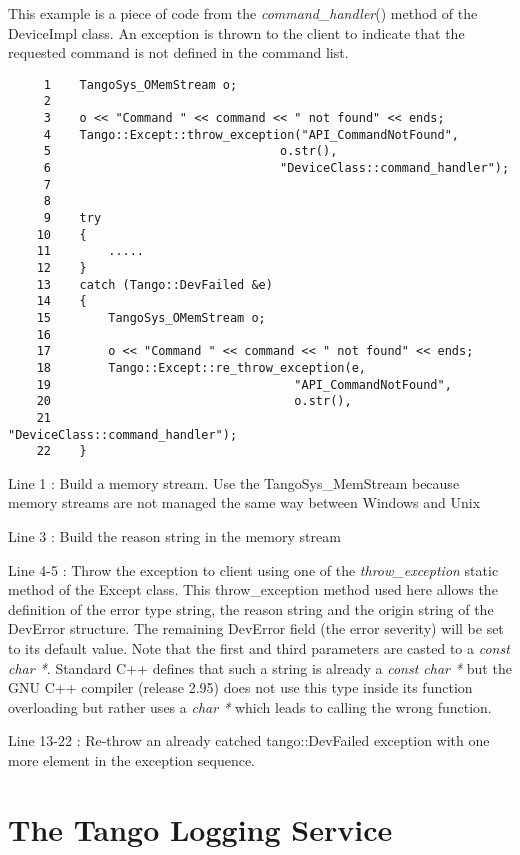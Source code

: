 This example is a piece of code from the \emph{command\_handler}()
method of the DeviceImpl class. An exception is
thrown to the client to indicate that the requested command is not
defined in the command list.


\begin{verbatim}
     1    TangoSys_OMemStream o;
     2                  
     3    o << "Command " << command << " not found" << ends;
     4    Tango::Except::throw_exception("API_CommandNotFound",
     5                                o.str(),
     6                                "DeviceClass::command_handler");
     7  
     8  
     9    try
    10    {
    11        .....
    12    }
    13    catch (Tango::DevFailed &e)
    14    {
    15        TangoSys_OMemStream o;
    16                  
    17        o << "Command " << command << " not found" << ends;
    18        Tango::Except::re_throw_exception(e,
    19                                  "API_CommandNotFound",
    20                                  o.str(),
    21                                  "DeviceClass::command_handler");
    22    }
\end{verbatim}


Line 1 : Build a memory stream. Use the TangoSys\_MemStream because
memory streams are not managed the same way between Windows and Unix

Line 3 : Build the reason string in the memory stream

Line 4-5 : Throw the exception to client using one of the \emph{throw\_exception}
static method of the Except class. This throw\_exception
method used here allows the definition of the error type string, the
reason string and the origin string of the DevError structure. The
remaining DevError field (the error severity) will be set to its default
value. Note that the first and third parameters are casted to a \emph{const
char {*}}. Standard C++ defines that such a string is already a \emph{const
char {*}} but the GNU C++ compiler (release 2.95) does not use this
type inside its function overloading but rather uses a \emph{char
{*}} which leads to calling the wrong function.

Line 13-22 : Re-throw an already catched tango::DevFailed exception
with one more element in the exception sequence.


\section{The Tango Logging Service }
\label{The-Tango-Logging chapter}

